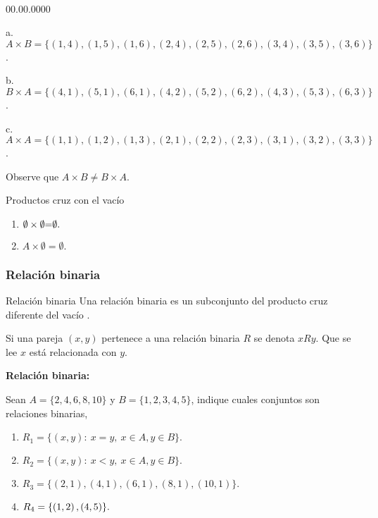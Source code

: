 \sol\ 
\begin{lyxlist}{00.00.0000}
\item [{a.}] $A\times B=\{\left(1,4\right),\left(1,5\right),\left(1,6\right),\left(2,4\right),\left(2,5\right),\left(2,6\right),\left(3,4\right),\left(3,5\right),\left(3,6\right)\}$.
\item [{b.}] $B\times A=\{\left(4,1\right),\left(5,1\right),\left(6,1\right),\left(4,2\right),\left(5,2\right),\left(6,2\right),\left(4,3\right),\left(5,3\right),\left(6,3\right)\}$.
\item [{c.}] $A\times A=\{\left(1,1\right),\left(1,2\right),\left(1,3\right),\left(2,1\right),\left(2,2\right),\left(2,3\right),\left(3,1\right),\left(3,2\right),\left(3,3\right)\}$.
\end{lyxlist}
Observe que $A\times B\neq B\times A.$

\begin{defi}{Productos cruz con el vacío}{}
\begin{enumerate}
\item $\text{\ensuremath{\emptyset\times\emptyset}=\ensuremath{\emptyset}.}$
\item $A\times\emptyset=\emptyset.$
\end{enumerate}
\end{defi}

\subsubsection{Relación binaria}

\begin{defi}{Relación binaria}{} Una relación binaria es un subconjunto
del producto cruz diferente del vacío . \end{defi}

\notacion Si una pareja $\left(x,y\right)$ pertenece a una relación
binaria $R$ se denota $xRy.$ Que se lee $x$ está relacionada con
$y.$

\begin{ejemplo}{\bf Relación binaria:} 

Sean $A=\{2,4,6,8,10\}$ y $B=\{1,2,3,4,5\}$, indique cuales conjuntos
son relaciones binarias,
\begin{enumerate}
\item $R_{1}=\{\left(x,y\right):\:x=y,\:x\in A,y\in B\}.$
\item $R_{2}=\{\left(x,y\right):\:x<y,\:x\in A,y\in B\}.$
\item $R_{3}=\{\left(2,1\right),\left(4,1\right),\left(6,1\right),\left(8,1\right),\left(10,1\right)\}.$
\item $R_{4}=\{\left(1,2\right),\mbox{\mbox{\ensuremath{\left(4,5\right)}}}\}.$
\end{enumerate}
\end{ejemplo}

